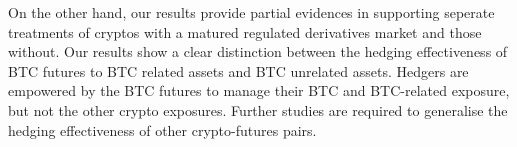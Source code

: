 \documentclass[11pt,a4paper,english]{article}
\begin{document}
On the other hand, our results provide partial evidences in supporting seperate treatments of cryptos with a matured regulated derivatives market and those without. 
Our results show a clear distinction between the hedging effectiveness of BTC futures to BTC related assets and BTC unrelated assets. 
Hedgers are empowered by the BTC futures to manage their BTC and BTC-related exposure, but not the other crypto exposures.
Further studies are required to generalise the hedging effectiveness of other crypto-futures pairs. 










\end{document}
